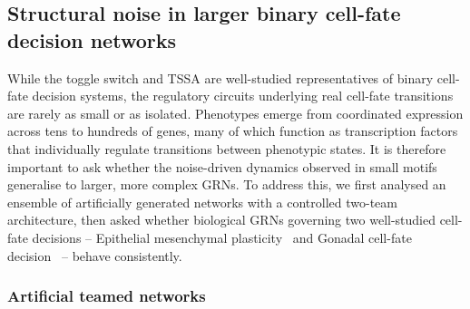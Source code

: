 \documentclass[11pt]{article}
\begin{document}
\subsection{Structural noise in larger binary cell-fate decision networks}

While the toggle switch and TSSA are well-studied representatives of binary cell-fate decision systems, the regulatory circuits underlying real cell-fate transitions are rarely as small or as isolated. Phenotypes emerge from coordinated expression across tens to hundreds of genes, many of which function as transcription factors that individually regulate transitions between phenotypic states. It is therefore important to ask whether the noise-driven dynamics observed in small motifs generalise to larger, more complex GRNs. To address this, we first analysed an ensemble of artificially generated networks with a controlled two-team architecture, then asked whether biological GRNs governing two well-studied cell-fate decisions -- Epithelial mesenchymal plasticity~\cite{hari2022landscape} and Gonadal cell-fate decision~\cite{rios2015boolean} -- behave consistently.

\subsubsection{Artificial teamed networks}
\end{document}
